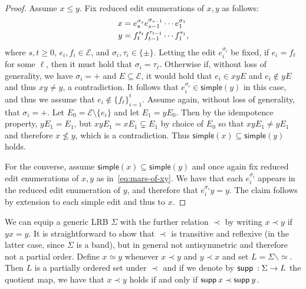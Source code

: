 \documentclass[11pt,a4paper]{article}
\newcommand{\supp}{{\mathsf{supp }\hspace{.075cm}}}
\newcommand{\simple}[1]{\mathrm{\mathsf{simple}}({#1})}
\begin{document}
\begin{proof}
    Assume $x\leqslant y$. Fix reduced edit enumerations of $x, y$ as follows:
        \begin{align}\label{eq:mars-of-xy}
            x &= e_s^{\sigma_s} e_{s-1}^{\sigma_{s-1}} \cdots e_{1}^{\sigma_1} \notag\\
            y &= f_t^{\tau_t} f_{t-1}^{\tau_{t-1}} \cdots f_{1}^{\tau_1},
        \end{align}
    where $s, t\geq 0$, $e_i, f_i\in {\mathcal{E}}$, and $\sigma_i, \tau_i\in\{\pm\}$.
    Letting the edit $e_i^{\sigma_i}$ be fixed, if $e_i = f_\ell$ for some $\ell$, then it must hold that $\sigma_i = \tau_\ell$. Otherwise if, without loss of generality, we have $\sigma_i=+$ and $E\subseteq\mathcal{E}$, it would hold that $e_i\in xy E$ and $e_i\notin y E$ and thus $xy\neq y$, a contradiction. It follows that $e_i^{\sigma_i}\in\simple{y}$ in this case, and thus we assume that $e_i \notin\{f_\ell\}_{i=1}^t$. Assume again, without loss of generality, that $\sigma_i = +$. Let $E_0=\mathcal{E}\setminus\{e_i\}$ and let $E_1 = yE_0$. Then by the idempotence property, $yE_1 = E_1$, but $xy E_1 = xE_1 \subsetneq E_1$ by choice of $E_0$ so that $xy E_1\neq yE_1$ and therefore $x\nleqslant y$, which is a contradiction. Thus $\simple{x}\subseteq\simple{y}$ holds.
    
    For the converse, assume $\simple{x}\subseteq\simple{y}$ and once again fix reduced edit enumerations of $x, y$ as in~\cref{eq:mars-of-xy}. We have that each $e_i^{\sigma_i}$ appears in the reduced edit enumeration of $y$, and therefore that $e_i^{\sigma_i} y = y$. The claim follows by extension to each simple edit and thus to $x$.
\end{proof}

We can equip a generic LRB $\Sigma$ with the further relation $\prec$ by writing $x\prec y$ if $yx = y$. It is straightforward to show that $\prec$ is transitive and reflexive (in the latter case, since $\Sigma$ is a band), but in general not antisymmetric and therefore not a partial order. Define $x\simeq y$ whenever $x\prec y$ and $y\prec x$ and set $L = \Sigma \backslash \simeq$. Then $L$ is a partially ordered set under $\prec$ and if we denote by $\supp:\Sigma\rightarrow L$ the quotient map, we have that $x\prec y$ holds if and only if $\supp{x} \prec \supp{y}$.
\end{document}
